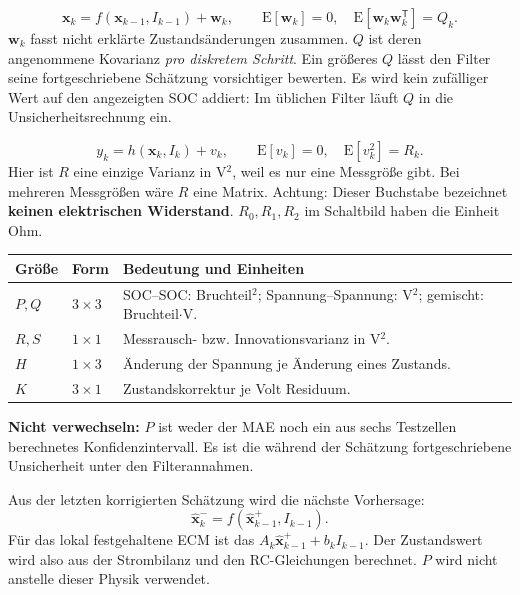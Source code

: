 \[
\mathbf x_k=f(\mathbf x_{k-1},I_{k-1})+\mathbf w_k,
\qquad \mathrm E[\mathbf w_k]=0,\quad
\mathrm E[\mathbf w_k\mathbf w_k^{\mathsf T}]=Q_k.
\]
$\mathbf w_k$ fasst nicht erklärte Zustandsänderungen zusammen. $Q$ ist deren angenommene Kovarianz \emph{pro diskretem Schritt}. Ein größeres $Q$ lässt den Filter seine fortgeschriebene Schätzung vorsichtiger bewerten. Es wird kein zufälliger Wert auf den angezeigten SOC addiert: Im üblichen Filter läuft $Q$ in die Unsicherheitsrechnung ein.

\[
y_k=h(\mathbf x_k,I_k)+v_k,\qquad \mathrm E[v_k]=0,
\quad\mathrm E[v_k^2]=R_k.
\]
Hier ist $R$ eine einzige Varianz in V$^2$, weil es nur eine Messgröße gibt. Bei mehreren Messgrößen wäre $R$ eine Matrix. Achtung: Dieser Buchstabe bezeichnet \textbf{keinen elektrischen Widerstand}. $R_0,R_1,R_2$ im Schaltbild haben die Einheit Ohm.

\begin{tabular}{p{.14\linewidth}p{.22\linewidth}p{.52\linewidth}}
\toprule Größe & Form & Bedeutung und Einheiten\\\midrule
$P,Q$ & $3\times3$ & SOC--SOC: Bruchteil$^2$; Spannung--Spannung: V$^2$; gemischt: Bruchteil$\cdot$V.\\
$R,S$ & $1\times1$ & Messrausch- bzw. Innovationsvarianz in V$^2$.\\
$H$ & $1\times3$ & Änderung der Spannung je Änderung eines Zustands.\\
$K$ & $3\times1$ & Zustandskorrektur je Volt Residuum.\\\bottomrule
\end{tabular}

\textbf{Nicht verwechseln:} $P$ ist weder der MAE noch ein aus sechs Testzellen berechnetes Konfidenzintervall. Es ist die während der Schätzung fortgeschriebene Unsicherheit unter den Filterannahmen.

Aus der letzten korrigierten Schätzung wird die nächste Vorhersage:
\[
\boxed{\hat{\mathbf x}_k^-=f(\hat{\mathbf x}_{k-1}^+,I_{k-1}).}
\]
Für das lokal festgehaltene ECM ist das $A_k\hat{\mathbf x}_{k-1}^++b_kI_{k-1}$. Der Zustandswert wird also aus der Strombilanz und den RC-Gleichungen berechnet. $P$ wird nicht anstelle dieser Physik verwendet.

